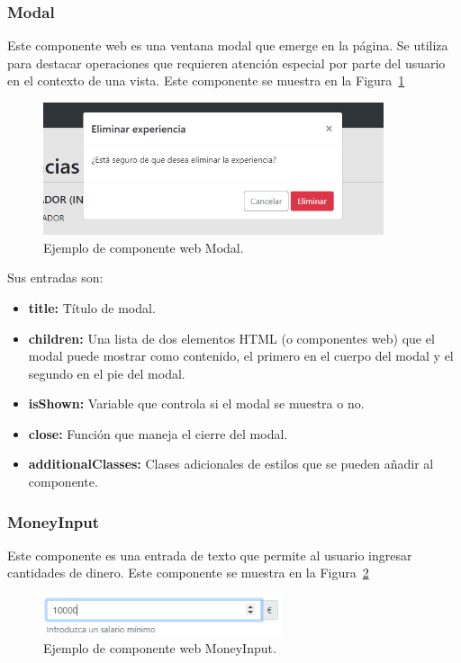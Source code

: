 \documentclass[a4paper, 12pt]{book}
\begin{document}
\subsubsection{Modal}
\label{subsec:wc_modal}
Este componente web es una ventana modal que emerge en la página.
Se utiliza para destacar operaciones que requieren atención especial por parte del usuario en el contexto de una vista.
Este componente se muestra en la Figura~\ref{fig:component_modal}

\begin{figure}
  \centering
  \includegraphics[width=10cm, keepaspectratio]{img/Modal.PNG}
  \caption{Ejemplo de componente web Modal.}\label{fig:component_modal}
\end{figure}

Sus entradas son:

		\begin{itemize}
		\item \textbf{title:} Título de modal.
		\item \textbf{children:} Una lista de dos elementos HTML (o componentes web) que el modal puede mostrar como contenido, el primero en el cuerpo del modal y el segundo en el pie del modal.
		\item \textbf{isShown:} Variable que controla si el modal se muestra o no.
		\item \textbf{close:} Función que maneja el cierre del modal.
		\item \textbf{additionalClasses:} Clases adicionales de estilos que se pueden añadir al componente.
		\end{itemize}

\subsubsection{MoneyInput}
\label{subsec:wc_money_input}
Este componente es una entrada de texto que permite al usuario ingresar cantidades de dinero.
Este componente se muestra en la Figura~\ref{fig:component_money_input}

\begin{figure}
  \centering
  \includegraphics[width=7cm, keepaspectratio]{img/MoneyInput.PNG}
  \caption{Ejemplo de componente web MoneyInput.}\label{fig:component_money_input}
\end{figure}
\end{document}
